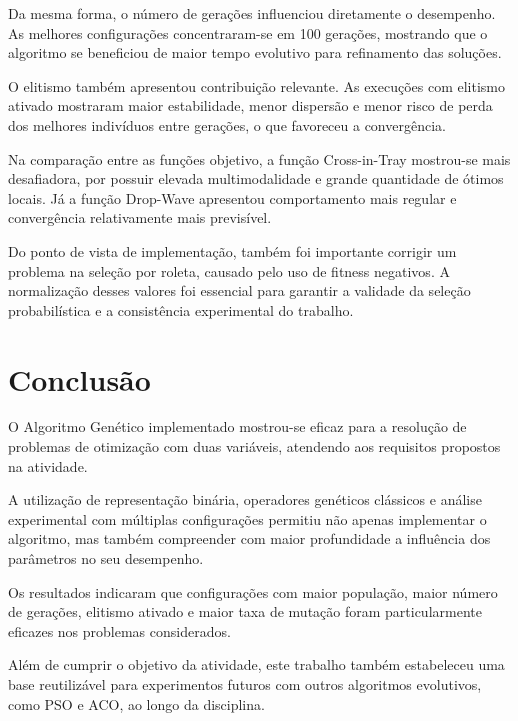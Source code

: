 \documentclass[a4paper,12pt]{article}
\begin{document}
Da mesma forma, o número de gerações influenciou diretamente o desempenho. As melhores configurações concentraram-se em 100 gerações, mostrando que o algoritmo se beneficiou de maior tempo evolutivo para refinamento das soluções.

O elitismo também apresentou contribuição relevante. As execuções com elitismo ativado mostraram maior estabilidade, menor dispersão e menor risco de perda dos melhores indivíduos entre gerações, o que favoreceu a convergência.

Na comparação entre as funções objetivo, a função Cross-in-Tray mostrou-se mais desafiadora, por possuir elevada multimodalidade e grande quantidade de ótimos locais. Já a função Drop-Wave apresentou comportamento mais regular e convergência relativamente mais previsível.

Do ponto de vista de implementação, também foi importante corrigir um problema na seleção por roleta, causado pelo uso de fitness negativos. A normalização desses valores foi essencial para garantir a validade da seleção probabilística e a consistência experimental do trabalho.


\section{Conclusão}

O Algoritmo Genético implementado mostrou-se eficaz para a resolução de problemas de otimização com duas variáveis, atendendo aos requisitos propostos na atividade.

A utilização de representação binária, operadores genéticos clássicos e análise experimental com múltiplas configurações permitiu não apenas implementar o algoritmo, mas também compreender com maior profundidade a influência dos parâmetros no seu desempenho.

Os resultados indicaram que configurações com maior população, maior número de gerações, elitismo ativado e maior taxa de mutação foram particularmente eficazes nos problemas considerados.

Além de cumprir o objetivo da atividade, este trabalho também estabeleceu uma base reutilizável para experimentos futuros com outros algoritmos evolutivos, como PSO e ACO, ao longo da disciplina.

\end{document}
